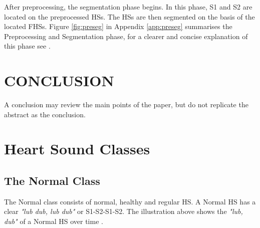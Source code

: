 \documentclass[10pt,twocolumn]{witseiepaper}
\begin{document}
After preprocessing, the segmentation phase begins. In this phase, S1 and S2 are located on the preprocessed HSs. The HSs are then segmented on the basis of the located FHSs. Figure \ref{fig:preseg} in Appendix \ref{app:preseg} summarises the Preprocessing and Segmentation phase, for a clearer and concise explanation of this phase see \cite{love}.


\section{CONCLUSION}

A conclusion may review the main points of the paper, but do not replicate the
abstract as the conclusion.




%







\appendix
\section{Heart Sound Classes}
\label{HS}

\subsection*{The Normal Class}
The Normal class consists of normal, healthy and regular HS. A Normal HS has a clear \textit{"lub dub, lub dub"} or S1-S2-S1-S2. The illustration above shows the \textit{"lub, dub"} of a Normal HS over time \cite{bentley}.

\end{document}
